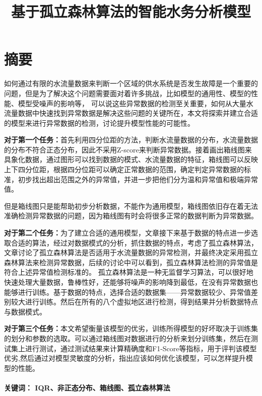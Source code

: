 \documentclass[UTF8]{article}
\begin{document}
	\title{\heiti \textbf {基于孤立森林算法的智能水务分析模型}\vspace{-2em}}
	\date{}
	\author{}
	\maketitle
	\section*{\centering 摘要}
		\par 如何通过有限的水流量数据来判断一个区域的供水系统是否发生故障是一个重要的问题，但是为了解决这个问题需要面对着许多挑战，比如模型的通用性、模型的性能、模型受噪声的影响等，
		可以说这些异常数据的检测至关重要，如何从大量水流量数据中快速找到异常数据是解决这些问题的关键所在，本文将探索并建立合适的模型来进行异常数据的检测，讨论提升模型性能的可能性。
		\par \textbf{对于第一个任务：}首先利用四分位距的方法，判断水流量数据的分布，水流量数据的分布不符合正态分布，因此不采用Z-score来判断异常数据。接着画出箱线图来具象化数据，通过图形可以找到数据的模式、水流量数据的特征，箱线图可以反映上下四分位距，根据四分位距可以确定正常数据的范围，确定判定异常数据的标准，初步找出超出范围之外的异常值，并进一步把他们分为温和异常值和极端异常值。
		\par 但是箱线图只是能帮助初步分析数据，不能作为通用模型，箱线图依旧存在着无法准确检测异常数据的问题，因为箱线图有时会将很多正常的数据判断为异常数据。
		\par \textbf{对于第二个任务：}为了建立合适的通用模型，文章接下来基于数据的特点进一步选取合适的算法，经过对数据模式的分析，抓住数据的特点，考虑了孤立森林算法，文章讨论了孤立森林算法是否适用于水流量数据的异常检测，并最终决定采用孤立森林算法来检测异常数据，后续的讨论中可以看到，孤立森林算法检测的异常值是符合上述异常值检测标准的。
		孤立森林算法是一种无监督学习算法，可以很好地快速处理大量数据，鲁棒性好，还能够将噪声的影响降到最低，在没有异常数据也能够进行训练。基于数据的特点，选择合适的数据集——异常数据较少、异常值差别较大进行训练。然后在所有的八个虚拟地区进行检测，得到结果并分析数据特点与数据模式。
		\par \textbf{对于第三个任务：}本文希望衡量该模型的优劣，训练所得模型的好坏取决于训练集的划分和参数的选取。可以通过箱线图对数据进行的分析来划分训练集，然后在测试集上进行测试，通过测试结果来计算精确度和F1-Score等指标，用于评判该模型优劣,然后通过对模型灵敏度的分析，指出应该如何优化该模型，可以怎样提升模型的性能。
		\\ 
		\\
		\textbf{\centering 关键词： IQR、非正态分布、箱线图、孤立森林算法}
		\newpage
\end{document}
